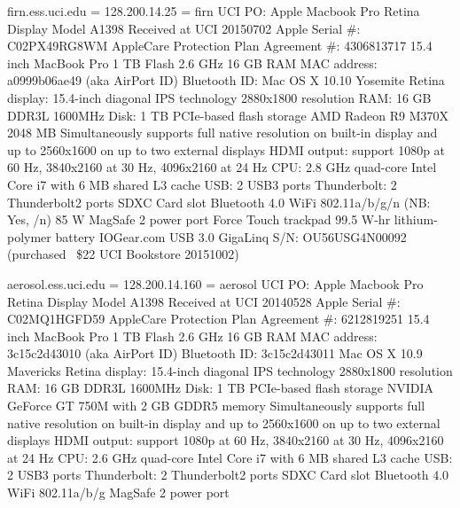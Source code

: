 \documentclass[12pt,twoside]{article}
\begin{document}
firn.ess.uci.edu = 128.200.14.25 = firn
UCI PO: 
Apple Macbook Pro Retina Display
Model A1398
Received at UCI 20150702
Apple Serial \#: C02PX49RG8WM
AppleCare Protection Plan Agreement \#: 4306813717
15.4 inch MacBook Pro
1 TB Flash
2.6 GHz
16 GB RAM
MAC address: a0999b06ae49 (aka AirPort ID)
Bluetooth ID: 
Mac OS X 10.10 Yosemite
Retina display: 15.4-inch diagonal
IPS technology 2880x1800 resolution
RAM: 16 GB DDR3L 1600MHz
Disk: 1 TB PCIe-based flash storage
AMD Radeon R9 M370X 2048 MB
Simultaneously supports full native resolution on built-in display and up to 2560x1600 on up to two external displays
HDMI output: support 1080p at 60 Hz, 3840x2160 at 30 Hz, 4096x2160 at 24 Hz
CPU: 2.8 GHz quad-core Intel Core i7 with 6 MB shared L3 cache
USB: 2 USB3 ports
Thunderbolt: 2 Thunderbolt2 ports
SDXC Card slot
Bluetooth 4.0
WiFi 802.11a/b/g/n (NB: Yes, /n)
85 W MagSafe 2 power port
Force Touch trackpad
99.5 W-hr lithium-polymer battery
IOGear.com USB 3.0 GigaLinq S/N: OU56USG4N00092 (purchased ~\$22 UCI Bookstore 20151002)

aerosol.ess.uci.edu = 128.200.14.160 = aerosol
UCI PO: 
Apple Macbook Pro Retina Display
Model A1398
Received at UCI 20140528
Apple Serial \#: C02MQ1HGFD59
AppleCare Protection Plan Agreement \#: 6212819251
15.4 inch MacBook Pro
1 TB Flash
2.6 GHz
16 GB RAM
MAC address: 3c15c2d43010 (aka AirPort ID)
Bluetooth ID: 3c15c2d43011
Mac OS X 10.9 Mavericks
Retina display: 15.4-inch diagonal
IPS technology 2880x1800 resolution
RAM: 16 GB DDR3L 1600MHz
Disk: 1 TB PCIe-based flash storage
NVIDIA GeForce GT 750M with 2 GB GDDR5 memory
Simultaneously supports full native resolution on built-in display and up to 2560x1600 on up to two external displays
HDMI output: support 1080p at 60 Hz, 3840x2160 at 30 Hz, 4096x2160 at 24 Hz
CPU: 2.6 GHz quad-core Intel Core i7 with 6 MB shared L3 cache
USB: 2 USB3 ports
Thunderbolt: 2 Thunderbolt2 ports
SDXC Card slot
Bluetooth 4.0
WiFi 802.11a/b/g 
MagSafe 2 power port
\end{document}
